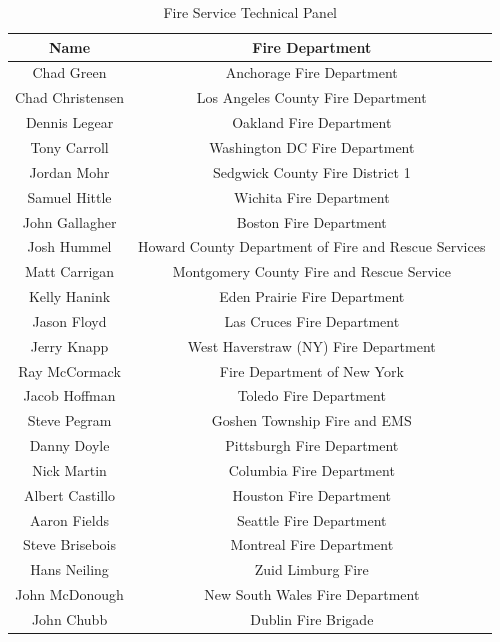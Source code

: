 \documentclass{article}
\begin{document}
\begin{center}
\begin{adjustwidth}{-0.25in}{-0.25in}
\begin{table}[H]
	\centering
	\begin{tabular}{|c|c|}
		\hline
		\bf{Name} & \bf{Fire Department} \\ \hline \hline
		Chad Green & Anchorage Fire Department \\ \hline
		Chad Christensen & Los Angeles County Fire Department \\ \hline
		Dennis Legear & Oakland Fire Department \\ \hline
		Tony Carroll & Washington DC Fire Department \\ \hline
		Jordan Mohr & Sedgwick County Fire District 1 \\ \hline
		Samuel Hittle & Wichita Fire Department \\ \hline
		John Gallagher & Boston Fire Department \\ \hline
		Josh Hummel & Howard County Department of Fire and Rescue Services \\ \hline
		Matt Carrigan & Montgomery County Fire and Rescue Service \\ \hline
		Kelly Hanink & Eden Prairie Fire Department \\ \hline
		Jason Floyd & Las Cruces Fire Department \\ \hline
		Jerry Knapp & West Haverstraw (NY) Fire Department \\ \hline
		Ray McCormack & Fire Department of New York \\ \hline
		Jacob Hoffman & Toledo Fire Department \\ \hline
		Steve Pegram & Goshen Township Fire and EMS \\ \hline
		Danny Doyle & Pittsburgh Fire Department \\ \hline
		Nick Martin & Columbia Fire Department \\ \hline
		Albert Castillo & Houston Fire Department \\ \hline
		Aaron Fields & Seattle Fire Department \\ \hline
		Steve Brisebois & Montreal Fire Department \\ \hline
		Hans Neiling & Zuid Limburg Fire \\ \hline
		John McDonough & New South Wales Fire Department \\ \hline
		John Chubb & Dublin Fire Brigade \\ \hline		 		  
	\end{tabular}
	\caption*{Fire Service Technical Panel}
\end{table}

\end{adjustwidth}
\end{center}
\end{document}
